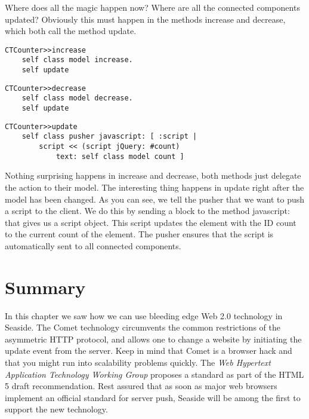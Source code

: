 \documentclass[a4paper,10pt,twoside]{book}
\newcommand{\ct}[1]{{\small\ttfamily\textup{#1}}}
\begin{document}
Where does all the magic happen now? Where are all the connected components updated? Obviously this must happen in the methods \ct{increase} and \ct{decrease}, which both call the method \ct{update}.

\begin{lstlisting}
CTCounter>>increase
    self class model increase.
    self update
\end{lstlisting}

\begin{lstlisting}
CTCounter>>decrease
    self class model decrease.
    self update
\end{lstlisting}

\begin{lstlisting}
CTCounter>>update
    self class pusher javascript: [ :script |
        script << (script jQuery: #count)
            text: self class model count ]
\end{lstlisting}

Nothing surprising happens in \ct{increase} and \ct{decrease}, both methods just delegate the action to their model. The interesting thing happens in \ct{update} right after the model has been changed. As you can see, we tell the pusher that we want to push a script to the client. We do this by sending a block to the method \ct{javascript:} that gives us a script object. This script updates the element with the ID \ct{count} to the current count of the element. The pusher ensures that the script is automatically sent to all connected components.

\section{Summary}
\label{book:web20:comet:summary}

In this chapter we saw how we can use bleeding edge Web 2.0 technology in Seaside. The Comet technology circumvents the common restrictions of the asymmetric HTTP protocol, and allows one to change a website by initiating the update event from the server. Keep in mind that Comet is a browser hack and that you might run into scalability problems quickly. The \textit{Web Hypertext Application Technology Working Group} proposes a standard as part of the HTML 5 draft recommendation. Rest assured that as soon as major web browsers implement an official standard for server push, Seaside will be among the first to support the new technology.
\end{document}
